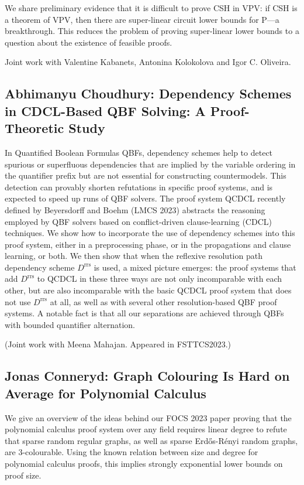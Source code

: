 \documentclass[11pt]{article}
\begin{document}
We share preliminary evidence that it is difficult to prove CSH in VPV: if CSH is a theorem of VPV, then there are super-linear circuit lower bounds for P---a breakthrough. This reduces the problem of proving super-linear lower bounds to a question about the existence of feasible proofs.
 
Joint work with Valentine Kabanets, Antonina Kolokolova and Igor C. Oliveira.


\subsection*{Abhimanyu Choudhury: Dependency Schemes in CDCL-Based QBF Solving:
A Proof-Theoretic Study}\label{Choudhury}

In Quantified Boolean Formulas QBFs, dependency schemes help
to detect spurious or superfluous dependencies that are implied by the
variable ordering in the quantifier prefix but are not essential for
constructing countermodels. This detection can provably shorten
refutations in specific proof systems, and is expected to speed up
runs of QBF solvers. The proof system QCDCL recently defined by
Beyersdorff and Boehm (LMCS 2023) abstracts the reasoning employed by
QBF solvers based on conflict-driven clause-learning (CDCL)
techniques. We show how to incorporate the use of dependency schemes
into this proof system, either in a preprocessing phase, or in the
propagations and clause learning, or both. We then show that when the
reflexive resolution path dependency scheme $D^{\mathrm{rrs}}$ is used, a mixed
picture emerges: the proof systems that add $D^{\mathrm{rrs}}$ to QCDCL in these
three ways are not only incomparable with each other, but are also
incomparable with the basic QCDCL proof system that does not use $D^{\mathrm{rrs}}$
at all, as well as with several other resolution-based QBF proof
systems. A notable fact is that all our separations are achieved
through QBFs with bounded quantifier alternation.

(Joint work with Meena Mahajan. Appeared in FSTTCS2023.)


\subsection*{Jonas Conneryd: Graph Colouring Is Hard on Average for Polynomial Calculus}\label{Conneryd}

We give an overview of the ideas behind our FOCS 2023 paper proving that the polynomial calculus proof system over any field requires linear degree to refute that sparse random regular graphs, as well as sparse Erd\H{o}s-R\'{e}nyi random graphs, are $3$-colourable. Using the known relation between size and degree for polynomial calculus proofs, this implies strongly exponential lower bounds on proof size.
\end{document}
